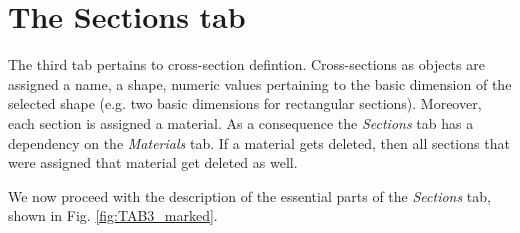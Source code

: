 \section{The Sections tab}

The third tab pertains to cross-section defintion. Cross-sections as objects 
are assigned a name, a shape, numeric values pertaining to the basic dimension 
of the selected shape (e.g. two basic dimensions for rectangular sections). 
Moreover, each section is assigned a material. As a consequence the 
\textit{Sections} tab has a dependency on the \textit{Materials} tab. If a  
material gets deleted, then all sections that were assigned that material get 
deleted as well. 

We now proceed with the description of the essential parts of the 
\textit{Sections} tab, shown in Fig. \ref{fig:TAB3_marked}.

